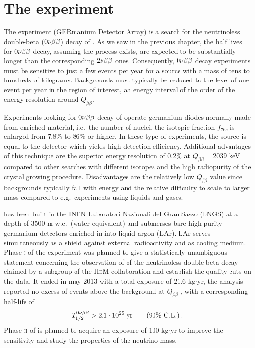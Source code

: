 \chapter{The {\gerda} experiment}
The {\gerda} experiment (GERmanium Detector Array) is a search for the neutrinoless double-beta ($0\nu\beta\beta$) decay of . As we saw in the previous chapter, the half lives for $0\nu\beta\beta$ decay, assuming the process exists, are expected to be substantially longer than the corresponding $2\nu\beta\beta$ ones. Consequently, $0\nu\beta\beta$ decay experiments must be sensitive to just a few events per year for a source with a mass of tens to hundreds of kilograms. Backgrounds must typically be reduced to the level of one event per year in the region of interest, an energy interval of the order of the energy resolution around $Q_{\beta\beta}$. 

Experiments looking for $0\nu\beta\beta$ decay of  operate germanium diodes normally made from enriched material, i.e.~the number of  nuclei, the isotopic fraction $f_{76}$, is enlarged from 7.8\% to 86\% or higher. In these type of experiments, the source is equal to the detector which yields high detection efficiency. Additional advantages of this technique are the superior energy resolution of 0.2\% at $Q_{\beta\beta}=2039$ keV compared to other searches with different isotopes and the high radiopurity of the crystal growing procedure. Disadvantages are the relatively low $Q_{\beta\beta}$ value since backgrounds typically fall with energy and the relative difficulty to scale to larger mass compared to e.g.~experiments using liquids and gases.

{\gerda} has been built in the INFN Laboratori Nazionali del Gran Sasso (LNGS) at a depth of 3500 m w.e.~(water equivalent) and submerses bare high-purity germanium detectors enriched in  into liquid argon (LAr). LAr serves simultaneously as a shield against external radioactivity and as cooling medium. Phase \textsc{i} of the experiment was planned to give a statistically unambiguous statement concerning the observation of of the neutrinoless double-beta decay claimed by a subgroup of the \textsc{HdM} collaboration \cite{hdmclaim} and establish the quality cuts on the data. It ended in may 2013 with a total exposure of 21.6 kg$\cdot$yr, the analysis reported no excess of events above the background at $Q_{\beta\beta}$ \cite{Agostini:2013mzu}, with a corresponding half-life of
\[T_{1/2}^{0\nu\beta\beta}>2.1\cdot10^{25}\;\text{yr}\qquad\text{(90\% C.L.)}\;.\]
Phase \textsc{ii} of {\gerda} is planned to acquire an exposure of 100 kg$\cdot$yr to improve the sensitivity and study the properties of the neutrino mass.

